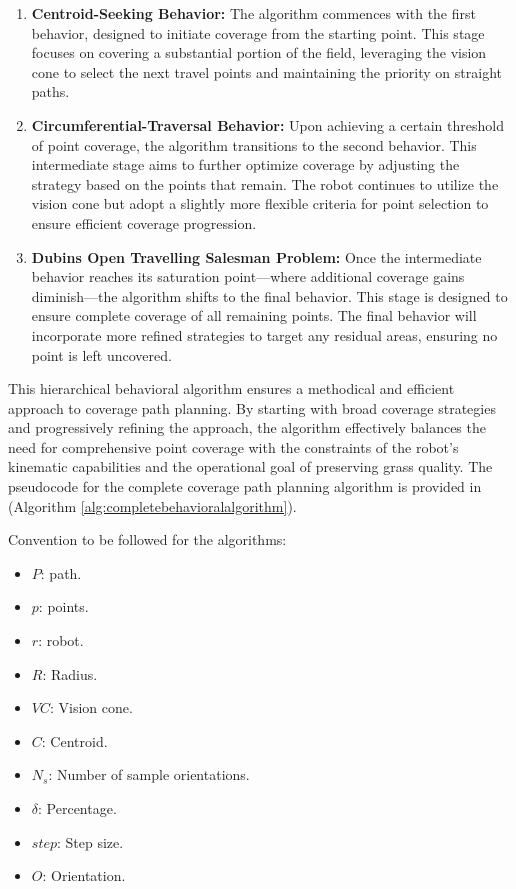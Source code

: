 \begin{enumerate}
    \item \textbf{Centroid-Seeking Behavior: }The algorithm commences with the first behavior, designed to initiate coverage from the starting point. This stage focuses on covering a substantial portion of the field, leveraging the vision cone to select the next travel points and maintaining the priority on straight paths.
    
    \item \textbf{Circumferential-Traversal Behavior:} Upon achieving a certain threshold of point coverage, the algorithm transitions to the second behavior. This intermediate stage aims to further optimize coverage by adjusting the strategy based on the points that remain. The robot continues to utilize the vision cone but adopt a slightly more flexible criteria for point selection to ensure efficient coverage progression.
    
    \item \textbf{Dubins Open Travelling Salesman Problem:} Once the intermediate behavior reaches its saturation point—where additional coverage gains diminish—the algorithm shifts to the final behavior. This stage is designed to ensure complete coverage of all remaining points. The final behavior will incorporate more refined strategies to target any residual areas, ensuring no point is left uncovered.
\end{enumerate}

\vspace*{6mm}   


This hierarchical behavioral algorithm ensures a methodical and efficient approach to coverage path planning. By starting with broad coverage strategies and progressively refining the approach, the algorithm effectively balances the need for comprehensive point coverage with the constraints of the robot's kinematic capabilities and the operational goal of preserving grass quality. The pseudocode for the complete coverage path planning algorithm is provided in (Algorithm \autoref{alg:completebehavioralalgorithm}). 

\vspace*{6mm}   

Convention to be followed for the algorithms:
\begin{multicols}{2}
\begin{itemize}[noitemsep,topsep=0pt]
    \item $P$: path.
    \item $p$: points.
    \item $r$: robot.
    \item $R$: Radius.
    \item $VC$: Vision cone.
    \item $C$: Centroid.
    \item $N_s$: Number of sample orientations.
    \item $ \delta$: Percentage.
    \item $step$: Step size.
    \item $O$: Orientation.
\end{itemize}
\end{multicols}

